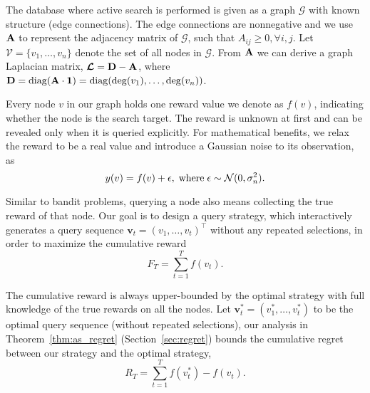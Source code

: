 
\newcommand{\cG}{\mathcal{G}}
\newcommand{\cH}{\mathcal{H}}
\newcommand{\bv}{\mathbf{v}}
\newcommand{\bc}{\mathbf{c}}
\newcommand{\bff}{\mathbf{f}}
\newcommand{\bSigma}{\boldsymbol{\Sigma}}
\newcommand{\bomega}{\boldsymbol{\omega}}




The database where active search is performed is given as a graph $\cG$ with known structure (edge connections). The edge connections are nonnegative and we use $\mathbf A$ to represent the adjacency matrix of $\cG$, such that $A_{ij}\geq0, \forall i,j$. Let 
$\mathcal{V}=\{v_1,\dotsc,v_n\}$ denote the set of all nodes in $\cG$.
From $\mathbf A$ we can derive a graph Laplacian matrix, 
${\boldsymbol{\mathcal L}} = {\mathbf D} - \mathbf A$, 
where ${\mathbf D}=\operatorname{diag}(\mathbf A\cdot\mathbf{1})=\operatorname{diag}(\deg(v_1),\dotsc,\deg(v_n))$.  

Every node $v$ in our graph holds one reward value
we denote as $f(v)$, indicating whether the node is the search target. The reward is unknown at first and can be revealed only when it is queried explicitly. For mathematical benefits, we relax the reward to be a real value and introduce a Gaussian noise to its observation, as
\begin{equation}
	y(v)=f(v)+\epsilon, \;{\rm where}\; \epsilon\sim\mathcal{N}(0,\sigma_n^2).
	\label{eq:observation}
\end{equation}


Similar to bandit problems, querying a node also means collecting the true reward of that node.
Our goal is to design a query strategy, 
which interactively generates a query sequence $\bv_t = (v_1,\dotsc,v_t)^\top$ without any repeated selections, in order 
to maximize the cumulative reward 
\begin{equation}
	F_T = \sum_{t=1}^T f(v_t).
\end{equation} 

The cumulative reward is always upper-bounded by the optimal strategy with full knowledge of the true rewards on all the nodes. Let $\bv^*_t=(v^*_1,\dotsc,v^*_t)$ to be the optimal query sequence (without repeated selections),
our analysis in Theorem~\ref{thm:as_regret} (Section~\ref{sec:regret}) bounds the cumulative regret between our strategy and the optimal strategy,
\begin{equation}
	R_T = \sum_{t=1}^T f(v^*_t) - f(v_t).
\end{equation}



